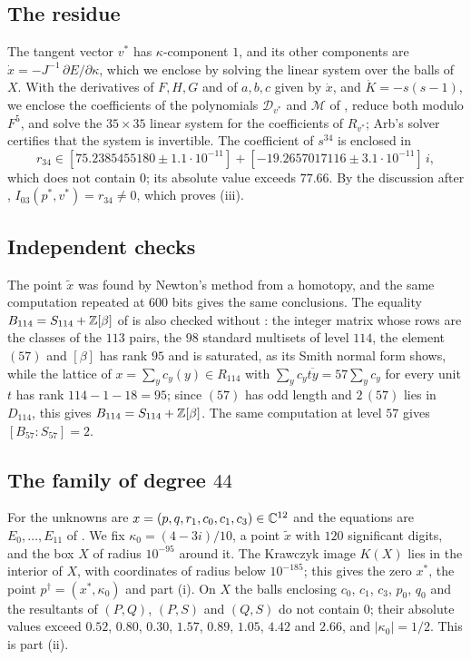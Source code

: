 \subsection*{The residue}
The tangent vector $v^{*}$ has $\kappa$-component $1$, and its other
components are $\dot x=-J^{-1}\,\partial E/\partial\kappa$, which we enclose
by solving the linear system over the balls of $X$. With the derivatives of
$F,H,G$ and of $a,b,c$ given by $\dot x$, and $\dot K=-s(s-1)$, we enclose
the coefficients of the polynomials $\mathcal D_{v^{*}}$ and $\mathcal M$ of
, reduce both modulo $F^{5}$, and solve the
$35\times35$ linear system for the coefficients of $R_{v^{*}}$; Arb's
solver certifies that the system is invertible. The coefficient of $s^{34}$
is enclosed in
\[
  r_{34}\in[75.2385455180\pm1.1\cdot10^{-11}]+[-19.2657017116\pm
  3.1\cdot10^{-11}]\,i,
\]
which does not contain $0$; its absolute value exceeds $77.66$. By the
discussion after , $I_{03}(p^{*},v^{*})=r_{34}\ne0$,
which proves (iii).

\subsection*{Independent checks}
The point $\tilde x$ was found by Newton's method from a homotopy, and the
same computation repeated at $600$ bits gives the same conclusions. The
equality $B_{114}=S_{114}+\mathbb{Z}[\beta]$ of  is also checked
without : the integer matrix whose rows are the classes of
the $113$ pairs, the $98$ standard multisets of level $114$, the element
$(57)$ and $[\beta]$ has rank $95$ and is saturated, as its Smith normal form
shows, while the lattice of $x=\sum_{y}c_{y}(y)\in R_{114}$ with
$\sum_{y}c_{y}\overline{ty}=57\sum_{y}c_{y}$ for every unit $t$ has rank
$114-1-18=95$; since $(57)$ has odd length and $2\,(57)$ lies in $D_{114}$,
this gives $B_{114}=S_{114}+\mathbb{Z}[\beta]$. The same computation at level $57$
gives $[B_{57}:S_{57}]=2$.

\subsection*{The family of degree \texorpdfstring{$44$}{44}}
For  the unknowns are $x=(p,q,r_{1},c_{0},c_{1},c_{3})\in
\mathbb{C}^{12}$ and the equations are $E_{0},\dots,E_{11}$ of
. We fix $\kappa_{0}=(4-3i)/10$, a point $\tilde x$ with
$120$ significant digits, and the box $X$ of radius $10^{-95}$ around it.
The Krawczyk image $K(X)$ lies in the interior of $X$, with coordinates of
radius below $10^{-185}$; this gives the zero $x^{*}$, the point
$p^{\dagger}=(x^{*},\kappa_{0})$ and part (i). On $X$ the balls enclosing
$c_{0}$, $c_{1}$, $c_{3}$, $p_{0}$, $q_{0}$ and the resultants of $(P,Q)$,
$(P,S)$ and $(Q,S)$ do not contain $0$; their absolute values exceed
$0.52$, $0.80$, $0.30$, $1.57$, $0.89$, $1.05$, $4.42$ and $2.66$, and
$|\kappa_{0}|=1/2$. This is part (ii).

